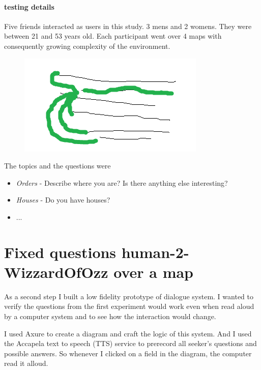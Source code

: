 	\paragraph{testing details}
	Five friends interacted as users in this study. 3 mens and 2 womens. They were between 21 and 53 years old. Each participant went over 4 maps with consequently growing complexity of the environment.

	
	
	
	\begin{figure}[h]
		\centering
		\includegraphics[width=0.7\linewidth]{figures/1stExp-human2humanOverMap/clusteredquestions}
		\caption[Best question for each topic]{}
		\caption{}
		\label{fig:clusteredquestions}
	\end{figure}
	
	The topics and the questions were
	\begin{itemize}
		\item \emph{Orders} - Describe where you are? Is there anything else interesting?
		\item \emph{Houses} - Do you have houses?
		\item ...
	\end{itemize}
	
		
	\section{Fixed questions human-2-WizzardOfOzz over a map}
	As a second step I built a low fidelity prototype of dialogue system. I wanted to verify the questions from the first experiment would work even when read aloud by a computer system and to see how the interaction would change.
	
	 I used Axure\cite{axure} to create a diagram and craft the logic of this system. And I used the Accapela text to speech (TTS) service\cite{accapela} to prerecord all seeker's questions and possible answers. So whenever I clicked on a field in the diagram, the computer read it alloud.
	 
